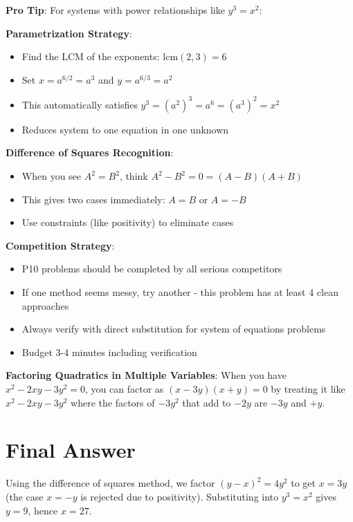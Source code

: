 \documentclass[12pt]{article}
\begin{document}
\begin{tipbox}
\textbf{Pro Tip}: For systems with power relationships like $y^3 = x^2$:

\textbf{Parametrization Strategy}:
\begin{itemize}
    \item Find the LCM of the exponents: $\text{lcm}(2,3) = 6$
    \item Set $x = a^{6/2} = a^3$ and $y = a^{6/3} = a^2$
    \item This automatically satisfies $y^3 = (a^2)^3 = a^6 = (a^3)^2 = x^2$
    \item Reduces system to one equation in one unknown
\end{itemize}

\textbf{Difference of Squares Recognition}:
\begin{itemize}
    \item When you see $A^2 = B^2$, think $A^2 - B^2 = 0 = (A-B)(A+B)$
    \item This gives two cases immediately: $A = B$ or $A = -B$
    \item Use constraints (like positivity) to eliminate cases
\end{itemize}

\textbf{Competition Strategy}:
\begin{itemize}
    \item P10 problems should be completed by all serious competitors
    \item If one method seems messy, try another - this problem has at least 4 clean approaches
    \item Always verify with direct substitution for system of equations problems
    \item Budget 3-4 minutes including verification
\end{itemize}

\textbf{Factoring Quadratics in Multiple Variables}:
When you have $x^2 - 2xy - 3y^2 = 0$, you can factor as $(x - 3y)(x + y) = 0$ by treating it like $x^2 - 2xy - 3y^2$ where the factors of $-3y^2$ that add to $-2y$ are $-3y$ and $+y$.
\end{tipbox}

\section*{Final Answer}

Using the difference of squares method, we factor $(y-x)^2 = 4y^2$ to get $x = 3y$ (the case $x = -y$ is rejected due to positivity). Substituting into $y^3 = x^2$ gives $y = 9$, hence $x = 27$.
\end{document}
